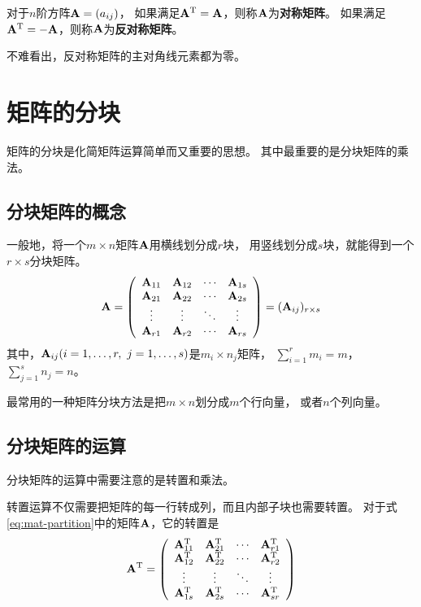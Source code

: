 \begin{definition}[对称矩阵与反对称矩阵]
  对于$n$阶方阵$\mmA=(a_{ij})$，
  如果满足$\mmA^\mT=\mmA$，则称$\mmA$为\textbf{对称矩阵}。
  如果满足$\mmA^\mT=-\mmA$，则称$\mmA$为\textbf{反对称矩阵}。
\end{definition}

\begin{remark}
  不难看出，反对称矩阵的主对角线元素都为零。
\end{remark}

\section{矩阵的分块}
矩阵的分块是化简矩阵运算简单而又重要的思想。
其中最重要的是分块矩阵的乘法。

\subsection{分块矩阵的概念}
\begin{definition}[分块矩阵]
  一般地，将一个$m\times n$矩阵$\mmA$用横线划分成$r$块，
  用竖线划分成$s$块，就能得到一个$r\times s$分块矩阵。
  \begin{equation} \label{eq:mat-partition}
  \mmA = \mmat{cccc}{
    \mmA_{11} & \mmA_{12} & \cdots & \mmA_{1s} \\
    \mmA_{21} & \mmA_{22} & \cdots & \mmA_{2s} \\
    \vdots    & \vdots    & \ddots & \vdots    \\
    \mmA_{r1} & \mmA_{r2} & \cdots & \mmA_{rs} }
    = (\mmA_{ij})_{r\times s}
  \end{equation}
  其中，$\mmA_{ij}(i=1,\dots,r,\ j=1,\dots,s)$是$m_i\times n_j$矩阵，
  $\sum_{i=1}^{r}m_i = m$，$\sum_{j=1}^{s}n_j=n$。
\end{definition}

最常用的一种矩阵分块方法是把$m\times n$划分成$m$个行向量，
或者$n$个列向量。

\subsection{分块矩阵的运算}
分块矩阵的运算中需要注意的是转置和乘法。

转置运算不仅需要把矩阵的每一行转成列，而且内部子块也需要转置。
对于式\eqref{eq:mat-partition}中的矩阵$\mmA$，它的转置是
\[
  \mmA^\mT = \mmat{cccc}{
    \mmA_{11}^\mT & \mmA_{21}^\mT & \cdots & \mmA_{r1}^\mT \\
    \mmA_{12}^\mT & \mmA_{22}^\mT & \cdots & \mmA_{r2}^\mT \\
    \vdots        & \vdots        & \ddots & \vdots        \\
    \mmA_{1s}^\mT & \mmA_{2s}^\mT & \cdots & \mmA_{sr}^\mT }
\]

